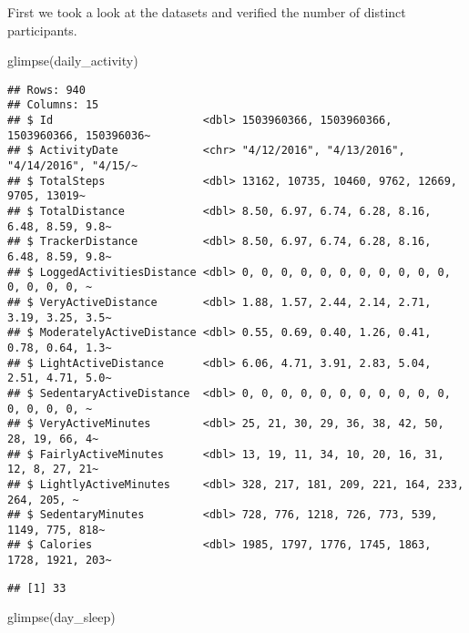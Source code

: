 \documentclass[
]{article}
\newenvironment{Shaded}{\begin{snugshade}}{\end{snugshade}}
\newcommand{\FunctionTok}[1]{\textcolor[rgb]{0.00,0.00,0.00}{#1}}
\newcommand{\NormalTok}[1]{#1}
\newcommand{\SpecialCharTok}[1]{\textcolor[rgb]{0.00,0.00,0.00}{#1}}
\begin{document}
First we took a look at the datasets and verified the number of distinct
participants.

\begin{Shaded}
\begin{Highlighting}[]
\FunctionTok{glimpse}\NormalTok{(daily\_activity)}
\end{Highlighting}
\end{Shaded}

\begin{verbatim}
## Rows: 940
## Columns: 15
## $ Id                       <dbl> 1503960366, 1503960366, 1503960366, 150396036~
## $ ActivityDate             <chr> "4/12/2016", "4/13/2016", "4/14/2016", "4/15/~
## $ TotalSteps               <dbl> 13162, 10735, 10460, 9762, 12669, 9705, 13019~
## $ TotalDistance            <dbl> 8.50, 6.97, 6.74, 6.28, 8.16, 6.48, 8.59, 9.8~
## $ TrackerDistance          <dbl> 8.50, 6.97, 6.74, 6.28, 8.16, 6.48, 8.59, 9.8~
## $ LoggedActivitiesDistance <dbl> 0, 0, 0, 0, 0, 0, 0, 0, 0, 0, 0, 0, 0, 0, 0, ~
## $ VeryActiveDistance       <dbl> 1.88, 1.57, 2.44, 2.14, 2.71, 3.19, 3.25, 3.5~
## $ ModeratelyActiveDistance <dbl> 0.55, 0.69, 0.40, 1.26, 0.41, 0.78, 0.64, 1.3~
## $ LightActiveDistance      <dbl> 6.06, 4.71, 3.91, 2.83, 5.04, 2.51, 4.71, 5.0~
## $ SedentaryActiveDistance  <dbl> 0, 0, 0, 0, 0, 0, 0, 0, 0, 0, 0, 0, 0, 0, 0, ~
## $ VeryActiveMinutes        <dbl> 25, 21, 30, 29, 36, 38, 42, 50, 28, 19, 66, 4~
## $ FairlyActiveMinutes      <dbl> 13, 19, 11, 34, 10, 20, 16, 31, 12, 8, 27, 21~
## $ LightlyActiveMinutes     <dbl> 328, 217, 181, 209, 221, 164, 233, 264, 205, ~
## $ SedentaryMinutes         <dbl> 728, 776, 1218, 726, 773, 539, 1149, 775, 818~
## $ Calories                 <dbl> 1985, 1797, 1776, 1745, 1863, 1728, 1921, 203~
\end{verbatim}

\begin{Shaded}
\end{Shaded}

\begin{verbatim}
## [1] 33
\end{verbatim}

\begin{Shaded}
\begin{Highlighting}[]
\FunctionTok{glimpse}\NormalTok{(day\_sleep)}
\end{Highlighting}
\end{Shaded}
\end{document}
